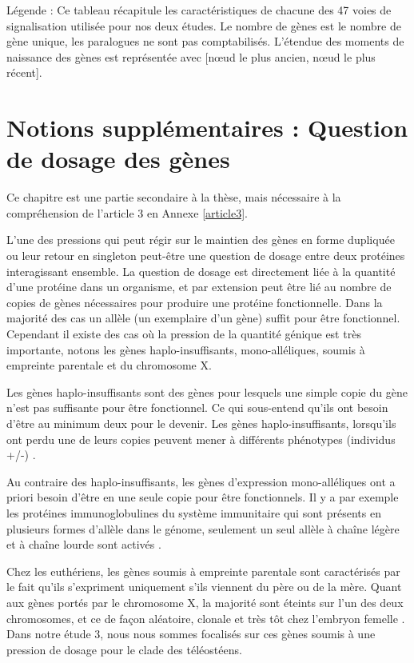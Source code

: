 Légende : Ce tableau récapitule les caractéristiques de chacune des 47 voies de signalisation utilisée pour nos deux études. Le nombre de gènes est le nombre de gène unique, les paralogues ne sont pas comptabilisés. L’étendue des moments de naissance des gènes est représentée avec [nœud le plus ancien, nœud le plus récent].

\newpage
\section{Notions supplémentaires : Question de dosage des gènes}
\par Ce chapitre est une partie secondaire à la thèse, mais nécessaire à la compréhension de l’article 3 en Annexe \ref{article3}. 
\par L’une des pressions qui peut régir sur le maintien des gènes en forme dupliquée ou leur retour en singleton peut-être une question de dosage entre deux protéines interagissant ensemble. La question de dosage est directement liée à la quantité d’une protéine dans un organisme, et par extension peut être lié au nombre de copies de gènes nécessaires pour produire une protéine fonctionnelle. Dans la majorité des cas un allèle (un exemplaire d’un gène) suffit pour être fonctionnel. Cependant il existe des cas où la pression de la quantité génique est très importante, notons les gènes haplo-insuffisants, mono-alléliques, soumis à empreinte parentale et du chromosome X. 
\par Les gènes haplo-insuffisants sont des gènes pour lesquels une simple copie du gène n’est pas suffisante pour être fonctionnel. Ce qui sous-entend qu’ils ont besoin d’être au minimum deux pour le devenir. Les gènes haplo-insuffisants, lorsqu’ils ont perdu une de leurs copies peuvent mener à différents phénotypes (individus +/-) \parencite{johnson_causes_2019}. 
\par Au contraire des haplo-insuffisants, les gènes d’expression mono-alléliques ont a priori besoin d’être en une seule copie pour être fonctionnels. Il y a par exemple les protéines immunoglobulines du système immunitaire qui sont présents en plusieurs formes d’allèle dans le génome, seulement un seul allèle à chaîne légère et à chaîne lourde sont activés \parencite{vettermann_allelic_2010}. 
\par Chez les euthériens, les gènes soumis à empreinte parentale sont caractérisés par le fait qu’ils s’expriment uniquement s’ils viennent du père ou de la mère. Quant aux gènes portés par le chromosome X, la majorité sont éteints sur l’un des deux chromosomes, et ce de façon aléatoire, clonale et très tôt chez l’embryon femelle \parencite{balaton_exceptional_2018}. 
Dans notre étude 3, nous nous sommes focalisés sur ces gènes soumis à une pression de dosage pour le clade des téléostéens.

